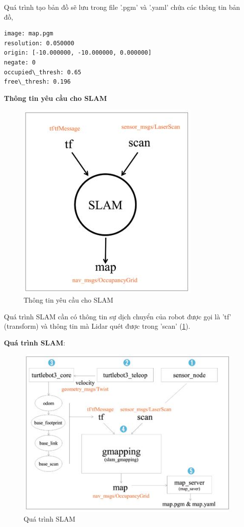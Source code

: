  Quá trình tạo bản đồ sẽ lưu trong file '.pgm' và '.yaml' chứa các thông tin bản đồ,
 \begin{lstlisting}[numbers=none]
image: map.pgm 
resolution: 0.050000
origin: [-10.000000, -10.000000, 0.000000] 
negate: 0
occupied\_thresh: 0.65 
free\_thresh: 0.196
 \end{lstlisting}
 
\textbf{Thông tin yêu cầu cho SLAM}\\
\begin{figure}[tph]
	\centering
	\includegraphics[width=0.5\linewidth]{chapter2/figs/slam_requiredInfo}
	\caption{Thông tin yêu cầu cho SLAM}
	\label{fig:slamrequiredinfo}
\end{figure}
Quá trình SLAM cần có thông tin sự dịch chuyển của robot được gọi là 'tf' (transform) và thông tin mà Lidar quét được trong 'scan' (\figurename{\ref{fig:slamrequiredinfo}}).

\textbf{Quá trình SLAM}:\\
\begin{figure}[tph]
	\centering
	\includegraphics[width=0.7\linewidth]{chapter2/figs/slam_flowChart}
	\caption{Quá trình SLAM}
	\label{fig:slamflowchart}
\end{figure}

